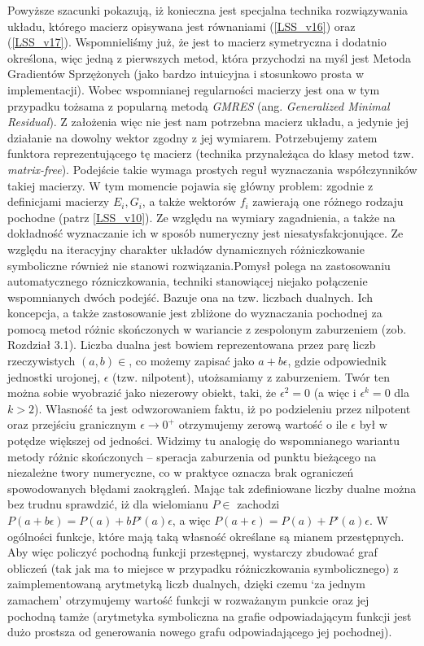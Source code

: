 \documentclass[12pt]{article}
\begin{document}
Powyższe szacunki pokazują, iż konieczna jest specjalna technika rozwiązywania układu, którego macierz opisywana jest równaniami (\ref{LSS_v16}) oraz (\ref{LSS_v17}). Wspomnieliśmy już, że jest to macierz symetryczna i dodatnio określona, więc jedną z pierwszych metod, która przychodzi na myśl jest Metoda Gradientów Sprzężonych (jako bardzo intuicyjna i stosunkowo prosta w implementacji). Wobec wspomnianej regularności macierzy jest ona w tym przypadku tożsama z popularną metodą \textit{GMRES} (ang. \textit{Generalized Minimal Residual}). Z założenia więc nie jest nam potrzebna macierz układu, a jedynie jej działanie na dowolny wektor zgodny z jej wymiarem. Potrzebujemy zatem funktora reprezentującego tę macierz (technika przynależąca do klasy metod tzw. \textit{matrix-free}).\newline
Podejście takie wymaga prostych reguł wyznaczania współczynników takiej macierzy. W tym momencie pojawia się główny problem: zgodnie z definicjami macierzy $ E_{i}, G_{i} $, a także wektorów $ f_{i} $ zawierają one różnego rodzaju pochodne (patrz \ref{LSS_v10}). Ze względu na wymiary zagadnienia, a także na dokładność wyznaczanie ich w sposób numeryczny jest niesatysfakcjonujące. Ze względu na iteracyjny charakter układów dynamicznych różniczkowanie symboliczne również nie stanowi rozwiązania.\newline Pomysł polega na zastosowaniu automatycznego rózniczkowania, techniki stanowiącej niejako połączenie wspomnianych dwóch podejść. Bazuje ona na tzw. liczbach dualnych. Ich koncepcja, a także zastosowanie jest zbliżone do wyznaczania pochodnej za pomocą metod różnic skończonych w wariancie z zespolonym zaburzeniem (zob. Rozdział 3.1). Liczba dualna jest bowiem reprezentowana przez parę liczb rzeczywistych $ (a,b) \in  $, co możemy zapisać jako $a + b\epsilon$, gdzie odpowiednik jednostki urojonej, $\epsilon$ (tzw. nilpotent), utożsamiamy z zaburzeniem. Twór ten można sobie wyobrazić jako niezerowy obiekt, taki, że $\epsilon^{2} = 0$ (a więc i $\epsilon^{k} = 0 $ dla $k > 2$). Własność ta jest odwzorowaniem faktu, iż po podzieleniu przez nilpotent oraz przejściu granicznym $ \epsilon \rightarrow 0^{+}$ otrzymujemy zerową wartość o ile $ \epsilon $ był w potędze większej od jedności. Widzimy tu analogię do wspomnianego wariantu metody różnic skończonych – speracja zaburzenia od punktu bieżącego na niezależne twory numeryczne, co w praktyce oznacza brak ograniczeń spowodowanych błędami zaokrągleń. \newline
Mając tak zdefiniowane liczby dualne można bez trudnu sprawdzić, iż dla wielomianu $ P \in $ zachodzi $ P(a + b\epsilon) = P(a) + bP’(a)\epsilon$, a więc  $ P(a + \epsilon) = P(a) + P’(a)\epsilon$.  W ogólności funkcje, które mają taką własność określane są mianem przestępnych. Aby więc policzyć pochodną funkcji przestępnej, wystarczy zbudować graf obliczeń (tak jak ma to miejsce w przypadku różniczkowania symbolicznego) z zaimplementowaną arytmetyką liczb dualnych, dzięki czemu ‘za jednym zamachem’ otrzymujemy wartość funkcji w rozważanym punkcie oraz jej pochodną tamże (arytmetyka symboliczna na grafie odpowiadającym funkcji jest dużo prostsza od generowania nowego grafu odpowiadającego jej pochodnej). \newline
\end{document}
